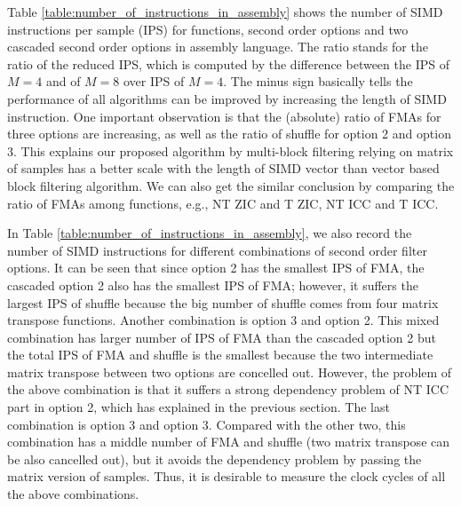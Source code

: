 Table \ref{table:number_of_instructions_in_assembly} shows the number of SIMD instructions per sample (IPS) for functions,
second order options and two cascaded second order options in assembly language. 
The ratio stands for the ratio of the reduced IPS,
which is computed by the difference 
between the IPS of $M{=}4$ and of $M{=}8$ over IPS of $M{=}4$. 
The minus sign basically tells the performance
of all algorithms can be improved by increasing the length of SIMD instruction.
One important observation is that the (absolute) ratio of FMAs for three options are increasing,
as well as the ratio of shuffle for option 2 and option 3. This explains our proposed algorithm by multi-block filtering 
relying on matrix of samples has a better scale with the length of SIMD vector than vector based block filtering algorithm.
We can also get the similar conclusion by comparing the ratio of FMAs among functions, e.g., NT ZIC and T ZIC, NT ICC and T ICC.

In Table \ref{table:number_of_instructions_in_assembly}, we also record the number of SIMD instructions for different combinations of second order filter options.
It can be seen that since option 2 has the smallest IPS of FMA, the cascaded option 2 also has the smallest IPS of FMA; 
however, it suffers the largest IPS of shuffle because the big number of shuffle comes from four matrix transpose functions. 
Another combination is option 3 and option 2. This mixed combination has larger number of IPS of FMA than the cascaded option 2 but
the total IPS of FMA and shuffle is the smallest because the two intermediate matrix transpose between two options 
are concelled out.
However, the problem of the above combination is that
it suffers a strong dependency problem of NT ICC part in option 2, 
which has explained in the previous section. 
The last combination is option 3 and option 3. Compared with the other two, this combination has a middle number of FMA and shuffle (two matrix transpose can be also cancelled out),
but it avoids the dependency problem by passing the matrix version of samples.
Thus, it is desirable to measure the clock cycles of all the above combinations.


